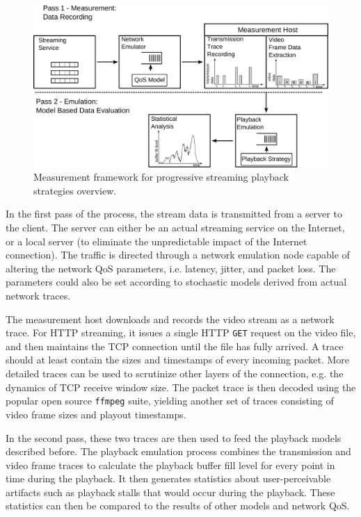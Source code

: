  
\begin{figure}[htb]
    \includegraphics[width=\textwidth]{images/measurement-model.pdf}
    \caption{Measurement framework for progressive streaming playback strategies overview.}
    \label{c3:fig:framework}
\end{figure}

In the first pass of the process, the stream data is transmitted from a server to the client. The server can either be an actual streaming service on the Internet, or a local server (to eliminate the unpredictable impact of the Internet connection). The traffic is directed through a network emulation node capable of altering the network QoS parameters, i.e. latency, jitter, and packet loss. The parameters could also be set according to stochastic models derived from actual network traces. 

The measurement host downloads and records the video stream as a network trace. For HTTP streaming, it issues a single HTTP \texttt{GET} request on the video file, and then maintains the TCP connection until the file has fully arrived. A trace should at least contain the sizes and timestamps of every incoming packet. More detailed traces can be used to scrutinize other layers of the connection, e.g. the dynamics of TCP receive window size. The packet trace is then decoded using the popular open source \texttt{ffmpeg} suite, yielding another set of traces consisting of video frame sizes and playout timestamps.

In the second pass, these two traces are then used to feed the playback models described before. The playback emulation process combines the transmission and video frame traces to calculate the playback buffer fill level for every point in time during the playback. It then generates statistics about user-perceivable artifacts such as playback stalls that would occur during the playback. These statistics can then be compared to the results of other models and network QoS.

